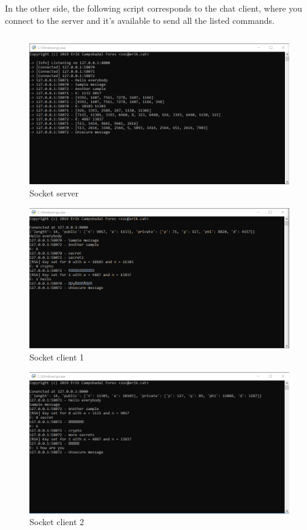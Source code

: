 \documentclass[usenames,dvipsnames,12pt]{report}
\begin{document}
\inputminted[linenos, breaklines=true]{python}{../Python/chat_server.py}

In the other side, the following script corresponds to the chat client, where you connect
to the server and it's available to send all the listed commands.

\inputminted[linenos, breaklines=true]{python}{../Python/chat.py}

\begin{figure}[H]
    \centering
    \includegraphics[width=15cm]{RSA2}
    \caption{Socket server}
\end{figure}

\begin{figure}[H]
    \centering
    \includegraphics[width=15cm]{RSA3}
    \caption{Socket client 1}
\end{figure}

\begin{figure}[H]
    \centering
    \includegraphics[width=15cm]{RSA4}
    \caption{Socket client 2}
\end{figure}
\end{document}
